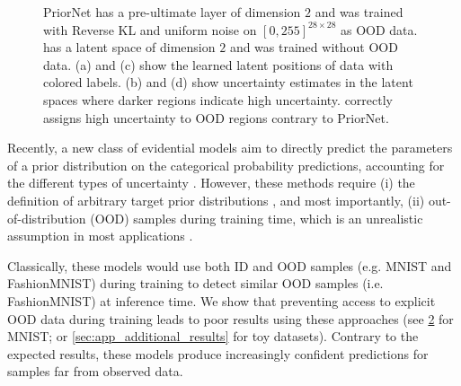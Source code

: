 \begin{figure}[ht!]
\begin{subfigure}[t]{0.23\columnwidth}
        \label{ours_visualization_unc}
    \end{subfigure}%
    \caption{PriorNet has a pre-ultimate layer of dimension $2$ and was trained with Reverse KL and uniform noise on $[0,255]^{28\times28}$ as OOD data. \PostNetacro has a latent space of dimension $2$ and was trained without OOD data. (a) and (c) show the learned latent positions of data with colored labels. (b) and (d) show uncertainty estimates in the latent spaces where darker regions indicate high uncertainty. \PostNetacro correctly assigns high uncertainty to OOD regions contrary to PriorNet.}
    \label{fig:mnist_2D_latent_space}
\end{figure}


Recently, a new class of evidential models aim to directly predict the parameters of a prior distribution on the categorical probability predictions, accounting for the different types of uncertainty \cite{PriorNetworks, reverse-kl, sensoy2018, uceloss}. However, these methods require (i) the definition of arbitrary target prior distributions \cite{PriorNetworks, reverse-kl, sensoy2018}, and most importantly, (ii) out-of-distribution (OOD) samples during training time, which is an unrealistic assumption in most applications \cite{PriorNetworks, reverse-kl}.

Classically, these models would use both ID and OOD samples (e.g. MNIST and FashionMNIST) during training to detect similar OOD samples (i.e. FashionMNIST) at inference time. We show that preventing access to explicit OOD data during training leads to poor results using these approaches (see \cref{fig:mnist_2D_latent_space} for MNIST; or \cref{sec:app_additional_results} for toy datasets). Contrary to the expected results, these models produce increasingly confident predictions for samples far from observed data. 


